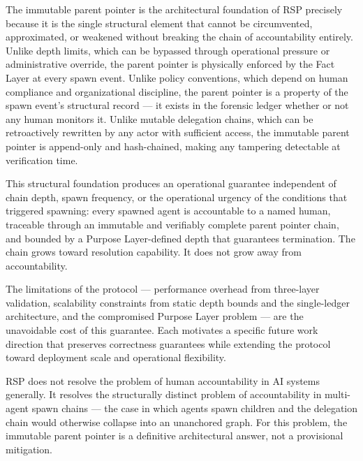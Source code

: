 The immutable parent pointer is the architectural foundation of RSP precisely because it is the single structural element that cannot be circumvented, approximated, or weakened without breaking the chain of accountability entirely. Unlike depth limits, which can be bypassed through operational pressure or administrative override, the parent pointer is physically enforced by the Fact Layer at every spawn event. Unlike policy conventions, which depend on human compliance and organizational discipline, the parent pointer is a property of the spawn event's structural record --- it exists in the forensic ledger whether or not any human monitors it. Unlike mutable delegation chains, which can be retroactively rewritten by any actor with sufficient access, the immutable parent pointer is append-only and hash-chained, making any tampering detectable at verification time.

This structural foundation produces an operational guarantee independent of chain depth, spawn frequency, or the operational urgency of the conditions that triggered spawning: every spawned agent is accountable to a named human, traceable through an immutable and verifiably complete parent pointer chain, and bounded by a Purpose Layer-defined depth that guarantees termination. The chain grows toward resolution capability. It does not grow away from accountability.

The limitations of the protocol --- performance overhead from three-layer validation, scalability constraints from static depth bounds and the single-ledger architecture, and the compromised Purpose Layer problem --- are the unavoidable cost of this guarantee. Each motivates a specific future work direction that preserves correctness guarantees while extending the protocol toward deployment scale and operational flexibility.

RSP does not resolve the problem of human accountability in AI systems generally. It resolves the structurally distinct problem of accountability in multi-agent spawn chains --- the case in which agents spawn children and the delegation chain would otherwise collapse into an unanchored graph. For this problem, the immutable parent pointer is a definitive architectural answer, not a provisional mitigation.
